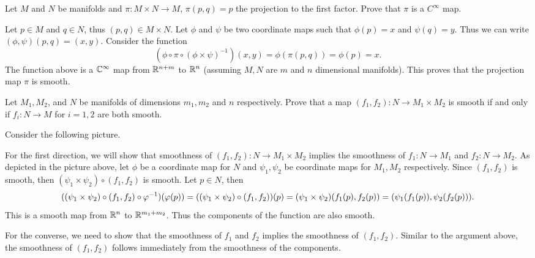 \begin{problem}
	Let $ M $ and $ N $ be manifolds and $ \pi: M\times N \to M $, $ \pi(p,q) = p $ the projection to the first factor. Prove that $ \pi $ is a $ C^\infty $ map.
\end{problem}

\begin{solution}
	Let $ p \in M $ and $ q \in N $, thus $ (p,q) \in M\times N $. Let $ \phi $ and $ \psi $ be two coordinate maps such that $ \phi(p) = x $ and $ \psi(q) = y $. Thus we can write $ (\phi, \psi)(p,q) = (x,y) $. Consider the function
	\[ (\phi \circ \pi \circ (\phi\times \psi)^{-1})(x,y) = \phi(\pi(p,q)) = \phi(p) = x.  \]
	The function above is a $ \mathbb{C}^\infty $ map from $ \mathbb{R}^{n+m} $ to $ \mathbb{R}^n $ (assuming $ M, N $ are $ m $ and $ n $ dimensional manifolds). This proves that the projection map $ \pi $ is smooth.
\end{solution}

\begin{problem}
	Let $ M_1, M_2 $, and $ N $ be manifolds of dimensions $ m_1,m_2 $ and $ n $ respectively. Prove that a map $ (f_1,f_2): N \to M_1\times M_2 $ is smooth if and only if $ f_i:N\to M $ for $ i=1,2 $ are both smooth.
\end{problem} 

\begin{solution}
	Consider the following picture.
	
	\FloatBarrier
	
	For the first direction, we will show that smoothness of $ (f_1,f_2): N \to M_1\times M_2 $ implies the smoothness of $ f_1:N\to M_1 $ and $ f_2: N \to M_2 $. As depicted in the picture above, let $ \phi $ be a coordinate map for $ N $ and $ \psi_1, \psi_2 $ be coordinate maps for $ M_1,M_2 $ respectively. Since $ (f_1,f_2) $ is smooth, then $ (\psi_1 \times \psi_2) \circ (f_1,f_2) $ is smooth. Let $ p \in N $, then
	\[ ((\psi_1 \times \psi_2) \circ (f_1,f_2) \circ \varphi^{-1})(\varphi(p)) =
	((\psi_1 \times \psi_2) \circ (f_1,f_2)) (p) = (\psi_1\times \psi_2)(f_1(p),f_2(p)) = (\psi_1(f_1(p)), \psi_2(f_2(p))).
	 \]
	This is a smooth map from $ \mathbb{R}^n $ to $ \mathbb{R}^{m_1+m_2} $. Thus the components of the function are also smooth.
	
	For the converse, we need to show that the smoothness of $ f_1 $ and $ f_2 $ implies the smoothness of $ (f_1,f_2) $. Similar to the argument above, the smoothness of $ (f_1,f_2) $ follows immediately from the smoothness of the components.
\end{solution}

